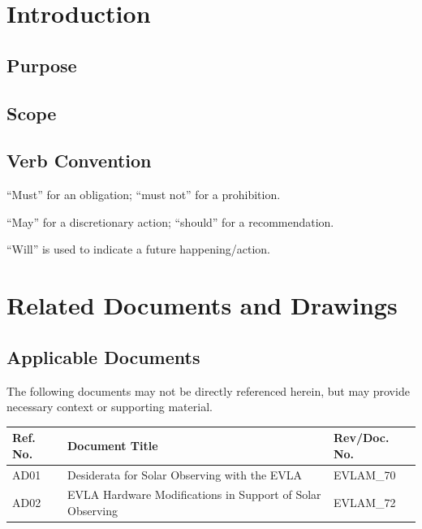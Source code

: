 \documentclass[titlepage]{article}
\begin{document}
\newpage
\tableofcontents
\listoffigures
\thispagestyle{fancy}
\newpage

\section{Introduction}

\subsection{Purpose}


\subsection{Scope}


\subsection{Verb Convention}
“Must” for an obligation; “must not” for a prohibition. 

“May” for a discretionary action; “should” for a recommendation. 

“Will” is used to indicate a future happening/action. 


\section{Related Documents and Drawings}
\subsection{Applicable Documents}
The following documents may not be directly referenced herein, but may provide necessary context or supporting material.
\begin{center}
\begin{tabular}{|m{2cm}|m{8cm}|m{3cm}|} \hline
    \rowcolor{nraoblue}
    Ref. No. & Document Title & Rev/Doc. No.\\ \hline
    AD01 & Desiderata for Solar Observing with the EVLA & EVLAM\_70 \\ 
    \hline
    AD02 & EVLA Hardware Modifications in Support of Solar Observing & EVLAM\_72 \\
    \hline
\end{tabular}
\end{center}
\end{document}
